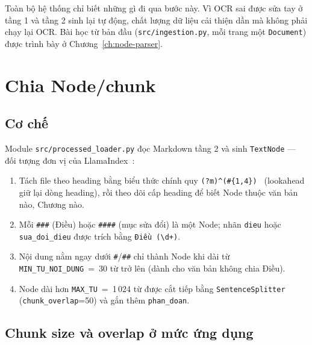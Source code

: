 Toàn bộ hệ thống chỉ biết những gì đi qua bước này. Vì OCR sai được sửa tay ở tầng 1 và tầng 2 sinh lại
tự động, chất lượng dữ liệu cải thiện dần mà không phải chạy lại OCR. Bài học từ bản đầu
(\texttt{src/ingestion.py}, mỗi trang một \texttt{Document}) được trình bày ở Chương~\ref{ch:node-parser}.

\section{Chia Node/chunk}
\label{sec:node}

\subsection{Cơ chế}

Module \texttt{src/processed\_loader.py} đọc Markdown tầng 2 và sinh \texttt{TextNode} --- đối tượng
đơn vị của LlamaIndex~\cite{llamaindex2025docs}:

\begin{enumerate}
  \item Tách file theo heading bằng biểu thức chính quy \texttt{(?m)\^{}(\#\{1,4\}) } (lookahead giữ
        lại dòng heading), rồi theo dõi cấp heading để biết Node thuộc văn bản nào, Chương nào.
  \item Mỗi \texttt{\#\#\#} (Điều) hoặc \texttt{\#\#\#\#} (mục sửa đổi) là một Node; nhãn
        \texttt{dieu} hoặc \texttt{sua\_doi\_dieu} được trích bằng \texttt{Điều (\textbackslash d+)}.
  \item Nội dung nằm ngay dưới \texttt{\#}/\texttt{\#\#} chỉ thành Node khi dài từ
        \texttt{MIN\_TU\_NOI\_DUNG}~=~30 từ trở lên (dành cho văn bản không chia Điều).
  \item Node dài hơn \texttt{MAX\_TU}~=~1\,024 từ được cắt tiếp bằng \texttt{SentenceSplitter}
        (\texttt{chunk\_overlap}=50) và gắn thêm \texttt{phan\_doan}.
\end{enumerate}

\subsection{Chunk size và overlap ở mức ứng dụng}

